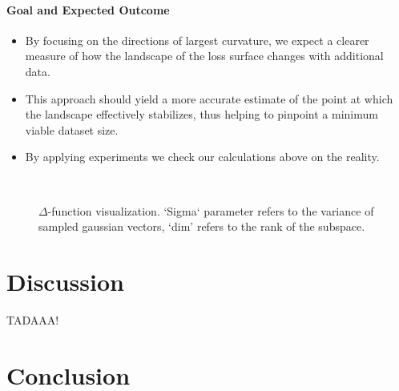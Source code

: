 \documentclass{article}
\begin{document}
\paragraph{Goal and Expected Outcome}
\begin{itemize}
  \item By focusing on the directions of largest curvature, we expect a clearer
        measure of how the landscape of the loss surface changes with additional data.
  \item This approach should yield a more accurate estimate of the point at which the
        landscape effectively stabilizes, thus helping to pinpoint a minimum viable dataset size.
  \item By applying experiments we check our calculations above on the reality.
\end{itemize}

\begin{figure}[!htbp]
  \centering
  \\
  \caption{$\Delta$-function visualization. `Sigma` parameter refers to the variance of sampled gaussian vectors, `dim'
    refers to the rank of the subspace.}
  \label{fig:base_delta}
\end{figure}



\section{Discussion}\label{sec:disc}

TADAAA!

\section{Conclusion}\label{sec:concl}
\end{document}

